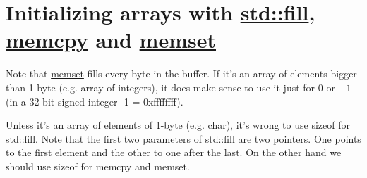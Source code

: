 \documentclass{book}
\begin{document}
	\section{Initializing arrays with \href{https://en.cppreference.com/w/cpp/container/array/fill}{std::fill}, \href{https://en.cppreference.com/w/cpp/string/byte/memcpy}{memcpy} and \href{https://en.cppreference.com/w/cpp/string/byte/memset}{memset}}
	Note that \href{https://en.cppreference.com/w/cpp/string/byte/memset}{memset} fills every byte in the buffer. If it's an array of elements bigger than 1-byte (e.g. array of integers), it does make sense to use it just for $0$ or $-1$ (in a 32-bit signed integer -1 = 0xffffffff).
	\par Unless it's an array of elements of 1-byte (e.g. char), it's wrong to use sizeof for std::fill. Note that the first two parameters of std::fill are two pointers. One points to the first element and the other to one after the last. On the other hand we should use sizeof for memcpy and memset.
\end{document}
